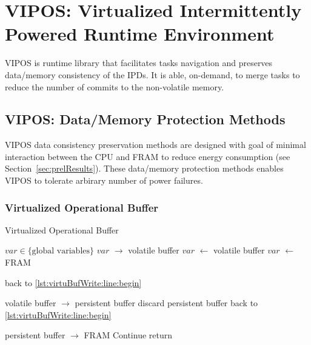 \documentclass[sigconf,anonymous,review]{acmart}
\begin{document}
\section{VIPOS: Virtualized Intermittently Powered Runtime Environment}
VIPOS is runtime library that facilitates tasks navigation and preserves data/memory consistency of the IPDs. It is able, on-demand, to merge tasks to reduce the number of commits to the non-volatile memory.

\subsection{VIPOS: Data/Memory Protection Methods}
VIPOS data consistency preservation methods are designed with goal of minimal interaction between the CPU and FRAM to reduce energy consumption (see Section~\ref{sec:prelResults}). These data/memory protection methods enables VIPOS to tolerate arbirary number of power failures. 

	\subsubsection{Virtualized Operational Buffer}

		\begin{algorithm}[t]
			\caption{Virtualized Operational Buffer}
			\label{algo:virtuBufWrite}
			\scriptsize
			\begin{algorithmic}[1]
				\State $var \in \text{\{global variables\}} $ 
				\State \label{lst:virtuBufWrite:line:begin} 
				 
					\State $var$  $\rightarrow$ \textsf{volatile buffer} \label{lst:virtuBufWrite:line:output}
									\label{lst:virtuBufWrite:line:inputBegin}
							\State $var$  $\leftarrow$  \textsf{volatile buffer} 
						\Else 
							\State $var$  $\leftarrow$  \textsf{FRAM}		\label{lst:virtuBufWrite:line:inputEnd}
						\EndIf

						\State back to \ref{lst:virtuBufWrite:line:begin}
					\EndIf
				\EndWhile

				 \label{lst:virtuBufWrite:line:commitBegin} 
					\State \textsf{volatile buffer} $\rightarrow$  \textsf{persistent buffer}
						\State discard \textsf{persistent buffer}
						\State back to  \ref{lst:virtuBufWrite:line:begin} 
						\State   \label{lst:virtuBufWrite:line:commitEnd}
					\EndIf
				\EndWhile 

				 \label{lst:virtuBufWrite:line:SecCommitBegin} 
					\State \textsf{persistent buffer} $\rightarrow$ FRAM 
						\State Continue
					\EndIf
				\EndWhile 
				\State     \label{lst:virtuBufWrite:line:SecCommitEnd}
				\State return
			\end{algorithmic}
		\end{algorithm}
\end{document}
